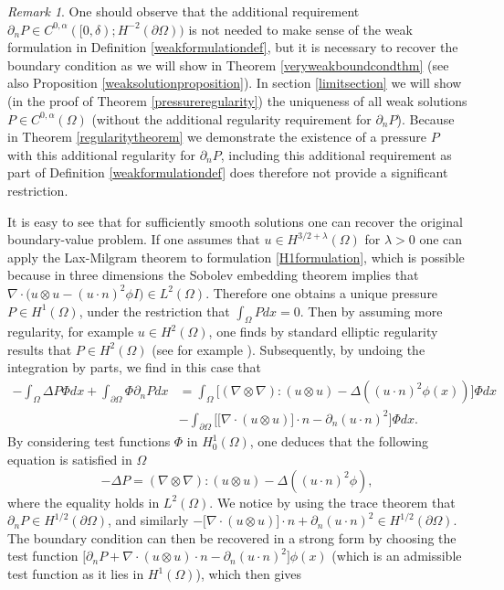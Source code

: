 \documentclass[12pt,a4paper]{article}
\theoremstyle{definition}
\theoremstyle{remark}
\newtheorem{remark}[theorem]{Remark}
\numberwithin{equation}{section}
\begin{document}
\begin{remark}
One should observe that the additional requirement $\partial_n P \in C^{0,\alpha} ([0,\delta) ; H^{-2} (\partial \Omega) )$ is not needed to make sense of the weak formulation in Definition \ref{weakformulationdef}, but it is necessary to recover the boundary condition as we will show in Theorem \ref{veryweakboundcondthm} (see also Proposition \ref{weaksolutionproposition}). In section \ref{limitsection} we will show (in the proof of Theorem \ref{pressureregularity}) the uniqueness of all weak solutions $P \in C^{0,\alpha} (\Omega)$ (without the additional regularity requirement for $\partial_n P$). Because in Theorem \ref{regularitytheorem} we demonstrate the existence of a pressure $P$ with this additional regularity for $\partial_n P$, including this additional requirement as part of Definition \ref{weakformulationdef} does therefore not provide a significant restriction.
\end{remark}
It is easy to see that for sufficiently smooth solutions one can recover the original boundary-value problem. If one assumes that $u \in H^{3/2+\lambda} (\Omega)$ for $\lambda > 0$ one can apply the Lax-Milgram theorem to formulation \eqref{H1formulation}, which is possible because in three dimensions the Sobolev embedding theorem implies that  $\nabla \cdot \big(u \otimes u - (u \cdot n)^2 \phi I \big) \in L^2 (\Omega)$. Therefore one obtains a unique pressure $P \in H^1 (\Omega)$, under the restriction that $\int_\Omega P dx = 0$. Then by assuming more regularity, for example $u \in H^2 (\Omega)$, one finds by standard elliptic regularity results that $P \in H^2 (\Omega)$ (see for example \cite[~Theorem 8.28]{salsa}). Subsequently, by undoing the integration by parts, we find in this case that
\begin{align*}
- \int_\Omega \Delta P \Phi dx + \int_{\partial \Omega} \Phi \partial_n P dx &= \int_\Omega \big[ (\nabla \otimes \nabla) : (u \otimes u) - \Delta ( (u \cdot n)^2 \phi (x)) \big] \Phi dx \\
&- \int_{\partial \Omega} \bigg[ \big[ \nabla \cdot (u \otimes u) \big] \cdot n - \partial_n (u \cdot n)^2\bigg] \Phi dx.
\end{align*}
By considering test functions $\Phi$ in $H^1_0 (\Omega)$, one deduces that the following equation is satisfied in $\Omega$
\begin{equation*}
-\Delta P = (\nabla \otimes \nabla) : (u \otimes u) - \Delta ((u \cdot n)^2 \phi),
\end{equation*}
where the equality holds in $L^2 (\Omega)$. We notice by using the trace theorem that $\partial_n P \in H^{1/2} (\partial \Omega)$, and similarly $- \big[ \nabla \cdot (u \otimes u) \big] \cdot n + \partial_n (u \cdot n)^2 \in H^{1/2} (\partial \Omega)$. The boundary condition can then be recovered in a strong form by choosing the test function $\big[ \partial_n P + \nabla \cdot (u \otimes u) \cdot n - \partial_n (u \cdot n)^2 \big] \phi (x)$ (which is an admissible test function as it lies in $H^1 (\Omega)$), which then gives
\end{document}
